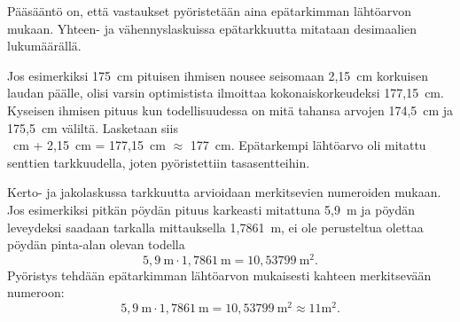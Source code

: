 Pääsääntö on, että vastaukset pyöristetään aina epätarkimman
lähtöarvon mukaan. Yhteen- ja vähennyslaskuissa epätarkkuutta
mitataan desimaalien lukumäärällä.

Jos esimerkiksi 175~cm pituisen ihmisen
nousee seisomaan 2,15~cm korkuisen laudan päälle, olisi varsin
optimistista ilmoittaa kokonaiskorkeudeksi 177,15~cm. Kyseisen ihmisen pituus kun todellisuudessa on mitä tahansa arvojen
174,5~cm ja 175,5~cm väliltä. Lasketaan siis\\
~cm + 2,15~cm = 177,15~cm $\approx$ 177~cm. 
Epätarkempi lähtöarvo oli mitattu senttien tarkkuudella, joten pyöristettiin tasasentteihin.

Kerto- ja jakolaskussa tarkkuutta arvioidaan merkitsevien numeroiden mukaan. Jos esimerkiksi pitkän pöydän pituus karkeasti
mitattuna 5,9~m ja pöydän leveydeksi saadaan tarkalla mittauksella
1,7861~m, ei ole perusteltua olettaa pöydän pinta-alan olevan todella
\[ 5,9~\textrm{m} \cdot 1,7861~\textrm{m} = 10,53799~\textrm{m}^2. \] 
Pyöristys tehdään epätarkimman
lähtöarvon mukaisesti kahteen merkitsevään numeroon:
\[ 5,9~\textrm{m} \cdot 1,7861~\textrm{m} = 10,53799~\textrm{m}^2 \approx 11 \textrm{m}^2.\] 

